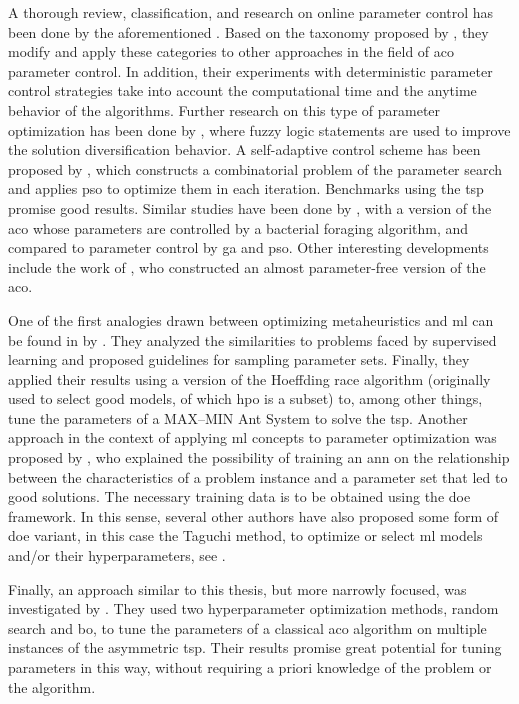  A thorough review, classification, and research on online parameter control has been done by the aforementioned \cite{stutzle2012parameter}. Based on the taxonomy proposed by \citeauthor{eiben1999parameter}, they modify and apply these categories to other approaches in the field of \gls{aco} parameter control. In addition, their experiments with deterministic parameter control strategies take into account the computational time and the anytime behavior of the algorithms. Further research on this type of parameter optimization has been done by \citet{neyoy2013dynamic}, where fuzzy logic statements are used to improve the solution diversification behavior. 
 A self-adaptive control scheme has been proposed by \citet{hao2006adaptive}, which constructs a combinatorial problem of the parameter search and applies \gls{pso} to optimize them in each iteration. Benchmarks using the \gls{tsp} promise good results. Similar studies have been done by \citet{li2016parameter}, with a version of the \gls{aco} whose parameters are controlled by a bacterial foraging algorithm, and compared to parameter control by \gls{ga} and \gls{pso}.
 Other interesting developments include the work of \citet{randall2004near}, who constructed an almost parameter-free version of the \gls{aco}.
 
One of the first analogies drawn between optimizing metaheuristics and \gls{ml} can be found in  by \citet{birattari2009tuning}. They analyzed the similarities to problems faced by supervised learning and proposed guidelines for sampling parameter sets. Finally, they applied their results using a version of the Hoeffding race algorithm \cite{maron1993hoeffding} (originally used to select good models, of which \gls{hpo} is a subset) to, among other things, tune the parameters of a MAX–MIN Ant System to solve the \gls{tsp}.
Another approach in the context of applying \gls{ml} concepts to parameter optimization was proposed by \citet{dobslaw2010parameter}, who explained the possibility of training an \gls{ann} on the relationship between the characteristics of a problem instance and a parameter set that led to good solutions. The necessary training data is to be obtained using the \gls{doe} framework. In this sense, several other authors have also proposed some form of \gls{doe} variant, in this case the Taguchi method, to optimize or select \gls{ml} models and/or their hyperparameters, see \cite{packianather2000optimizing, tortum2007investigation, jung2011artificial}.

Finally, an approach similar to this thesis, but more narrowly focused, was investigated by \citet{yin2021bayesian}. They used two hyperparameter optimization methods, random search and \gls{bo}, to tune the parameters of a classical \gls{aco} algorithm on multiple instances of the asymmetric \gls{tsp}. Their results promise great potential for tuning parameters in this way, without requiring a priori knowledge of the problem or the algorithm.
